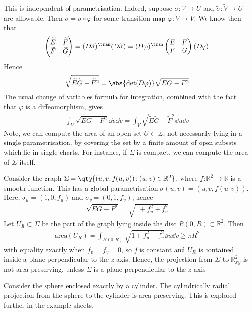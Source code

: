 \begin{remark}
	This is independent of parametrisation.
	Indeed, suppose $\sigma \colon V \to U$ and $\widetilde \sigma \colon \widetilde V \to U$ are allowable.
	Then $\widetilde \sigma = \sigma \circ \varphi$ for some transition map $\varphi \colon \widetilde V \to V$.
	We know then that
	\begin{align*}
		\begin{pmatrix}
			\widetilde E & \widetilde F \\
			\widetilde F & \widetilde G
		\end{pmatrix} = (D\widetilde \sigma)^\tran (D\widetilde \sigma) = (D\varphi)^\tran \begin{pmatrix}
			E & F \\
			F & G
		\end{pmatrix} (D\varphi)
	\end{align*}
	Hence,
	\begin{align*}
		\sqrt{\widetilde E \widetilde G - \widetilde F^2} = \abs{\det(D\varphi)} \sqrt{EG - F^2}
	\end{align*}
	The usual change of variables formula for integration, combined with the fact that $\varphi$ is a diffeomorphism, gives
	\begin{align*}
		\int_V \sqrt{EG - F^2} \dd{u}\dd{v} = \int_{\widetilde V} \sqrt{\widetilde E \widetilde G - \widetilde F^2} \dd{u}\dd{v}
	\end{align*}
	Note, we can compute the area of an open set $U \subset \Sigma$, not necessarily lying in a single parametrisation, by covering the set by a finite amount of open subsets which lie in single charts.
	For instance, if $\Sigma$ is compact, we can compute the area of $\Sigma$ itself.
\end{remark}
\begin{example}
	Consider the graph $\Sigma = \qty{(u,v,f(u,v)) \colon (u,v) \in \mathbb R^2}$, where $f \colon \mathbb R^2 \to \mathbb R$ is a smooth function.
	This has a global parametrisation $\sigma(u,v) = (u,v,f(u,v))$.
	Here, $\sigma_u = (1,0,f_u)$ and $\sigma_v = (0,1,f_v)$, hence
	\begin{align*}
		\sqrt{EG - F^2} = \sqrt{1+f_u^2+f_v^2}
	\end{align*}
	Let $U_R \subset \Sigma$ be the part of the graph lying inside the disc $B(0,R) \subset \mathbb R^2$.
	Then
	\begin{align*}
		\mathrm{area}(U_R) = \int_{B(0,R)} \sqrt{1+f_u^2+f_v^2} \dd{u}\dd{v} \geq \pi R^2
	\end{align*}
	with equality exactly when $f_u = f_v = 0$, so $f$ is constant and $U_R$ is contained inside a plane perpendicular to the $z$ axis.
	Hence, the projection from $\Sigma$ to $\mathbb R^2_{xy}$ is not area-preserving, unless $\Sigma$ is a plane perpendicular to the $z$ axis.
\end{example}
\begin{example}
	Consider the sphere enclosed exactly by a cylinder.
	The cylindrically radial projection from the sphere to the cylinder is area-preserving.
	This is explored further in the example sheets.
\end{example}

